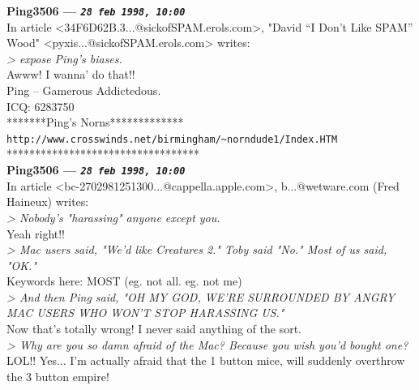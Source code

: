 \documentclass[11pt,twoside,a4paper]{article}
\begin{document}
\begin{multicols*}{2}
 
		
	
		
\textbf{Ping3506 --- \emph{\texttt{28 feb 1998, 10:00}}}~\\

In article <34F6D62B.3...@sickofSPAM.erols.com>, "David ``I Don't Like SPAM'' Wood" <pyxis...@sickofSPAM.erols.com> writes:~\\
\emph{> expose Ping's biases.}~\\

Awww! I wanna' do that!!~\\

Ping -- Gamerous Addictedous.~\\
ICQ:  6283750~\\
*******Ping's Norns*************~\\
\texttt{http://www.crosswinds.net/birmingham/\textasciitilde norndude1/Index.HTM}~\\
**********************************~\\

 
		
	
		
\textbf{Ping3506 --- \emph{\texttt{28 feb 1998, 10:00}}}~\\

In article <bc-2702981251300...@cappella.apple.com>, b...@wetware.com (Fred Haineux) writes:~\\
\emph{> Nobody's "harassing" anyone except you.}~\\

Yeah right!!~\\

\emph{> Mac users said, "We'd like Creatures 2." Toby said "No." Most of us said, "OK."}~\\

Keywords here: MOST (eg. not all.  eg. not me)~\\

\emph{> And then Ping said, "OH MY GOD, WE'RE SURROUNDED BY ANGRY MAC USERS WHO WON'T STOP HARASSING US."}~\\

Now that's totally wrong! I never said anything of the sort.~\\

\emph{> Why are you so damn afraid of the Mac? Because you wish you'd bought one?}~\\

LOL!! Yes... I'm actually afraid that the 1 button mice, will suddenly overthrow the 3 button empire!~\\


\end{multicols*}
\end{document}
